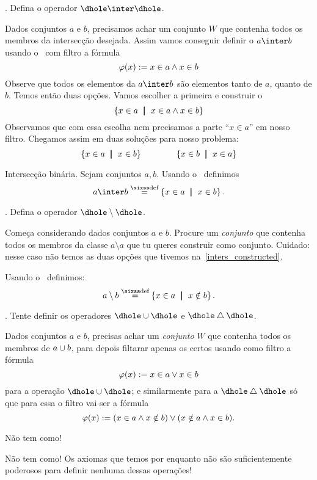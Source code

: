 \example.
Defina o operador $\dhole\inter\dhole$.

\solution
Dados conjuntos $a$ e $b$,
precisamos achar um conjunto $W$ que contenha todos os membros
da intersecção desejada.  Assim vamos conseguir definir o $a \inter b$
usando o~ com filtro a fórmula
$$
\varphi(x)\mathrel{:=} {x \in a \land x \in b}
$$
Observe que todos os elementos da $a \inter b$ são elementos tanto de $a$,
quanto de $b$.
Temos então duas opções.  Vamos escolher a primeira e construir o
$$
\left\{x \in a \ \;\mathord{\pmb{\mid}}\;\ x \in a \land x \in b\right\}
$$
Observamos que com essa escolha nem precisamos a parte ``$x \in a$'' em nosso filtro.
Chegamos assim em duas soluções para nosso problema:
$$
\left\{x \in a \ \;\mathord{\pmb{\mid}}\;\ x \in b\right\}
\hskip 4em\relax
\left\{x \in b \ \;\mathord{\pmb{\mid}}\;\ x \in a\right\}
$$

\endexample

 Intersecção binária.
\label{inters_constructed}%
Sejam conjuntos $a,b$.
Usando o~ definimos
$$
a\inter b \defeq \setst {x\in a} {x\in b}.
$$

\exercise.
Defina o operador $\dhole\setminus\dhole$.

\hint
Começa considerando dados conjuntos $a$ e $b$.
Procure um \emph{conjunto} que contenha todos os membros
da classe $a\setminus a$ que tu queres construir como conjunto.
Cuidado: nesse caso não temos as duas opções que tivemos
na~\ref{inters_constructed}.

\solution
Usando o~ definimos:
$$
a\setminus b\defeq \setst {x \in a} {x \notin b}.
$$

\endexercise

\exercise.
\label{cannot_define_union_yet}%
Tente definir os operadores $\dhole\union\dhole$ e $\dhole\symdiff\dhole$.

\hint
Dados conjuntos $a$ e $b$,
precisas achar um \emph{conjunto} $W$
que contenha todos os membros de $a\cup b$,
para depois filtarar apenas os certos usando
como filtro a fórmula
$$
\varphi(x) \mathrel{:=}
x \in a \lor x \in b
$$
para a operação $\dhole\union\dhole$;
e similarmente para a $\dhole\symdiff\dhole$ só que
para essa o filtro vai ser a fórmula
$$
\varphi(x)\mathrel{:=}
{\left({x \in a \land x \notin b}\right)}
\lor
{\left({x \notin a \land x \in b}\right)}.
$$

\hint
Não tem como!

\solution
Não tem como!
Os axiomas que temos por enquanto não são suficientemente poderosos para
definir nenhuma dessas operações!

